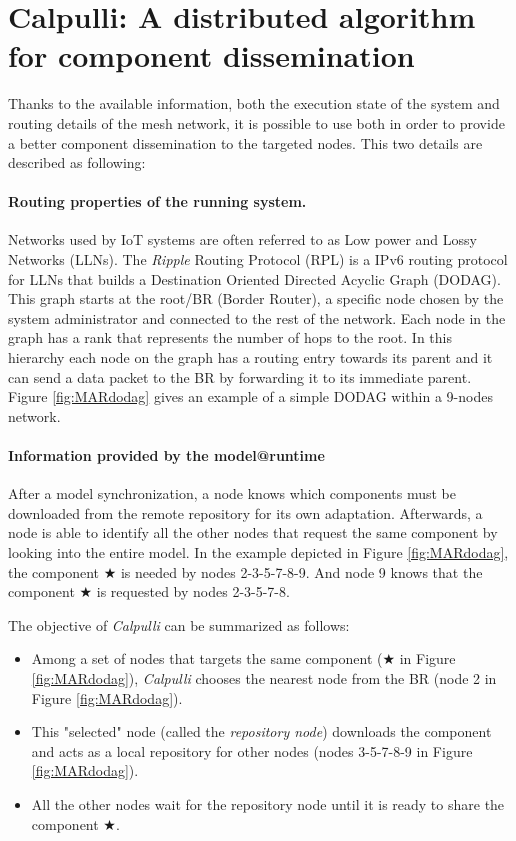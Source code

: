 \section{Calpulli: A distributed algorithm for component dissemination}
Thanks to the available information, both the execution state of the system and routing details of the mesh network, it is possible to use both in order to provide a better component dissemination to the targeted nodes.
This two details are described as following:

\paragraph{Routing properties of the running system.} Networks used by IoT systems are often referred to as Low power and Lossy Networks (LLNs). The \emph{Ripple} Routing Protocol (RPL)\cite{rfc6550} is a IPv6 routing protocol for LLNs that builds a Destination Oriented Directed Acyclic Graph (DODAG). This graph starts at the root/BR (Border Router), a specific node chosen by the system administrator and connected to the rest of the network. Each node in the graph has a rank that represents the number of hops to the root. In this hierarchy each node on the graph has a routing entry towards its parent and it can send a data packet to the BR by forwarding it to its immediate parent. Figure \ref{fig:MARdodag} gives an example of a simple DODAG within a 9-nodes network.

\paragraph{Information provided by the model@runtime} After a model synchronization, a node knows which components must be downloaded from the remote repository for its own adaptation.
Afterwards, a node is able to identify all the other nodes that request the same component by looking into the entire model.
In the example depicted in Figure \ref{fig:MARdodag}, the component $\bigstar$ is needed by nodes 2-3-5-7-8-9. 
And node 9 knows that the component $\bigstar$ is requested by nodes 2-3-5-7-8.

The objective of \emph{Calpulli} can be summarized as follows:
\begin{itemize}
	\item Among a set of nodes that targets the same component ($\bigstar$ in Figure \ref{fig:MARdodag}), \emph{Calpulli} chooses the nearest node from the BR (node 2 in Figure \ref{fig:MARdodag}).
	\item This "selected" node (called the \emph{repository node}) downloads the component and acts as a local repository for other nodes (nodes 3-5-7-8-9 in Figure \ref{fig:MARdodag}).
	\item All the other nodes wait for the repository node until it is ready to share the component $\bigstar$.
\end{itemize}

